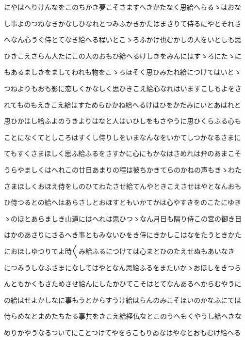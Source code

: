\documentclass[a4paper,11pt,landscape]{ltjtarticle}
\begin{document}
にやはへりけんなをこのちかき夢こそさますへきかたなく思給へらるゝはおな
\par\medskip
し事よのつねなきかなしひなれとつみふかきかたはまさりて侍るにやとそれさ
\par\medskip
へなん心うく侍とてなき給へる程いとこゝろふかけ也むかしの人をいとしも思
\par\medskip
ひきこえさらん人たにこの人のおもひ給へるけしきをみんにはすゝろにたゝに
\par\medskip
もあるましきをましてわれも物をこゝろほそく思ひみたれ給につけてはいとゝ
\par\medskip
つねよりもおも影に恋しくかなしく思ひきこえ給心なれはいますこしもよをさ
\par\medskip
れてものもえきこえ給はすためらひかね給へるけはひをかたみにいとあはれと
\par\medskip
思ひかはし給ふよのうきよりはなと人はいひしをもさやうに思ひくらふる心も
\par\medskip
ことになくてとしころはすくし侍りしをいまなんなをいかてしつかなるさまに
\par\medskip
てもすくさまほしく思ふ給ふるをさすかに心にもかなはさめれは弁のあまこそ
\par\medskip
うらやましくはへれこの廿日あまりの程は彼ちかきてらのかねの声もきゝわた
\par\medskip
さまほしくおほえ侍をしのひてわたさせ給てんやときこえさせはやとなんおも
\par\medskip
ひ侍つるとの給へはあらさしとおほすともいかてかは心やすきをのこたにゆき
\par\medskip
ゝのほとあらましき山道にはへれは思ひつゝなん月日も隔り侍この宮の御き日
\par\medskip
はかのあさりにさるへき事ともみないひをき侍にきかしこはなをたうときかた
\par\medskip
におほしゆつりてよ時〱み給ふるにつけては心まとひのたえせぬもあいなき
\par\medskip
につみうしなふさまになしてはやとなん思給ふるをまたいかゝおほしをきつら
\par\medskip
んともかくもさためさせ給んにしたかひてこそはとてなんあるへからむやうに
\par\medskip
の給はせよかしなに事もうとからすうけ給はらんのみこそほいのかなふにては
\par\medskip
侍らめなとまめたちたる事共をきこえ給経仏なとこのうへもくやうし給へきな
\par\medskip
めりかやうなるついてにことつけてやをらこもりゐなはやなとおもむけ給へる
\par\medskip
\end{document}

